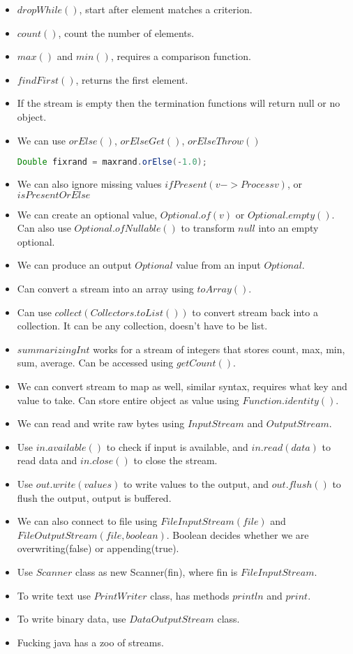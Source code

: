 \documentclass[a4paper]{article}
\begin{document}
\begin{itemize}
\begin{lstlisting}[language=Java]
    \end{lstlisting}
    \item $dropWhile()$, start after element matches a criterion.
    \item $count()$, count the number of elements.
    \item $max()$ and $min()$, requires a comparison function.
    \item $findFirst()$, returns the first element.
    \item If the stream is empty then the termination functions will return null or no object.
    \item We can use $orElse()$, $orElseGet()$, $orElseThrow()$
    \begin{lstlisting}[language=Java]
        Double fixrand = maxrand.orElse(-1.0);
    \end{lstlisting}
    \item We can also ignore missing values $ifPresent(v -> Process v)$, or $isPresentOrElse$
    \item We can create an optional value, $Optional.of(v)$ or $Optional.empty()$. Can also use $Optional.ofNullable()$ to transform $null$ into an empty optional.
    \item We can produce an output $Optional$ value from an input $Optional$.
    \item Can convert a stream into an array using $toArray()$.
    \item Can use $collect(Collectors.toList())$ to convert stream back into a collection. It can be any collection, doesn't have to be list.
    \item $summarizingInt$ works for a stream of integers that stores count, max, min, sum, average. Can be accessed using $getCount()$.
    \item We can convert stream to map as well, similar syntax, requires what key and value to take. Can store entire object as value using $Function.identity()$.
    \item We can read and write raw bytes using $InputStream$ and $OutputStream$.
    \item Use $in.available()$ to check if input is available, and $in.read(data)$ to read data and $in.close()$ to close the stream.
    \item Use $out.write(values)$ to write values to the output, and $out.flush()$ to flush the output, output is buffered.
    \item We can also connect to file using $FileInputStream(file)$ and $FileOutputStream(file, boolean)$. Boolean decides whether we are overwriting(false) or appending(true).
    \item Use $Scanner$ class as new Scanner(fin), where fin is $FileInputStream$.
    \item To write text use $PrintWriter$ class, has methods $println$ and $print$.
    \item To write binary data, use $DataOutputStream$ class.
    \item Fucking java has a zoo of streams.
\end{itemize}
\end{document}
